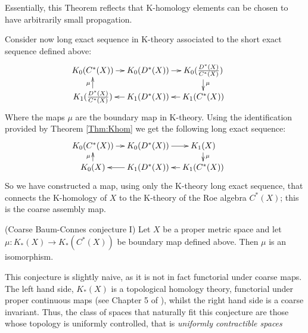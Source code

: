 Essentially, this Theorem reflects that K-homology elements can be chosen to have arbitrarily small propagation.

Consider now long exact sequence in K-theory associated to the short exact sequence defined above:
\begin{equation*}
\xymatrix@=1em{
K_{0}(C^{*}(X)) \ar[r] & K_{0}(D^{*}(X)) \ar[r]& K_{0}(\frac{D^{*}(X)}{C^{*}(X)})\ar[d]^{\mu} & \\
K_{1}(\frac{D^{*}(X)}{C^{*}(X)})\ar[u]^{\mu}& K_{1}(D^{*}(X)) \ar[l]& K_{1}(C^{*}(X))\ar[l] &
}
\end{equation*}
Where the maps $\mu$ are the boundary map in K-theory. Using the identification provided by Theorem \ref{Thm:Khom} we get the following long exact sequence:
\begin{equation*}
\xymatrix@=1em{
K_{0}(C^{*}(X)) \ar[r] & K_{0}(D^{*}(X)) \ar[r]& K_{1}(X)\ar[d]^{\mu} & \\
K_{0}(X)\ar[u]^{\mu}& K_{1}(D^{*}(X)) \ar[l]& K_{1}(C^{*}(X))\ar[l] &
}
\end{equation*}
So we have constructed a map, using only the K-theory long exact sequence, that connects the K-homology of $X$ to the K-theory of the Roe algebra $C^{*}(X)$; this is the coarse assembly map.
\begin{conjecture}\label{conj:CBC1}(Coarse Baum-Connes conjecture I)
Let $X$ be a proper metric space and let $\mu: K_{*}(X) \rightarrow K_{*}(C^{*}(X))$ be boundary map defined above. Then $\mu$ is an isomorphism.
\end{conjecture}
This conjecture is slightly naive, as it is not in fact functorial under coarse maps. The left hand side, $K_{*}(X)$ is a topological homology theory, functorial under proper continuous maps (see Chapter 5 of \cite{MR1399087}), whilst the right hand side is a coarse invariant. Thus, the class of spaces that naturally fit this conjecture are those whose topology is uniformly controlled, that is \textit{uniformly contractible spaces}

